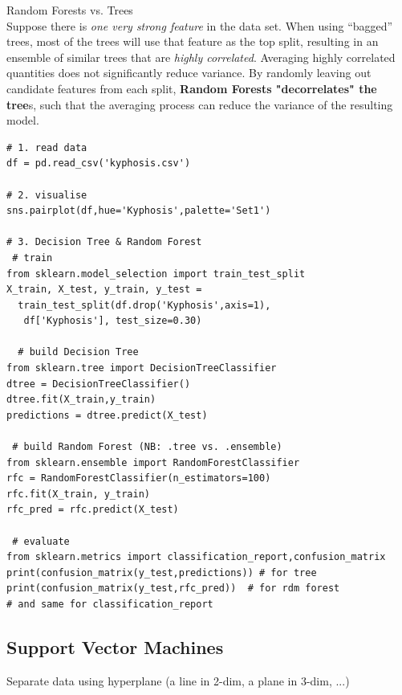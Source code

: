 \documentclass[12pt]{article}
\begin{document}
Random Forests vs. Trees \\
Suppose there is \textit{one very strong feature} in the data set. When using “bagged” trees, most of the trees will use that feature as the top split, resulting in an ensemble of similar trees that are \textit{highly correlated}. Averaging highly correlated quantities does not significantly reduce variance. By randomly leaving out candidate features from each split, \textbf{Random Forests "decorrelates" the tree}s, such that the averaging process can reduce the variance of the resulting model.

\begin{lstlisting}
# 1. read data
df = pd.read_csv('kyphosis.csv')

# 2. visualise 
sns.pairplot(df,hue='Kyphosis',palette='Set1')

# 3. Decision Tree & Random Forest
 # train
from sklearn.model_selection import train_test_split
X_train, X_test, y_train, y_test = 
  train_test_split(df.drop('Kyphosis',axis=1),
   df['Kyphosis'], test_size=0.30)
  
  # build Decision Tree
from sklearn.tree import DecisionTreeClassifier
dtree = DecisionTreeClassifier()
dtree.fit(X_train,y_train)
predictions = dtree.predict(X_test)

 # build Random Forest (NB: .tree vs. .ensemble)
from sklearn.ensemble import RandomForestClassifier
rfc = RandomForestClassifier(n_estimators=100)
rfc.fit(X_train, y_train)
rfc_pred = rfc.predict(X_test)

 # evaluate
from sklearn.metrics import classification_report,confusion_matrix
print(confusion_matrix(y_test,predictions)) # for tree
print(confusion_matrix(y_test,rfc_pred))  # for rdm forest
# and same for classification_report
\end{lstlisting}

\subsection{Support Vector Machines}
Separate data using hyperplane (a line in 2-dim, a plane in 3-dim, ...)
\end{document}

